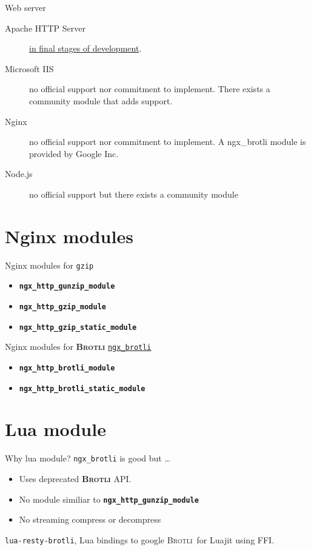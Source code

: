 \documentclass[11pt]{beamer}
\def\brotli{\textsc{Brotli}}
\newcommand{\gamename}{\textbf{\brotli}\xspace}
\begin{document}
\begin{frame}{Web server}
  \begin{description}
  \item [Apache HTTP Server] \href{https://httpd.apache.org/docs/trunk/mod/mod_brotli.html}
    {in final stages of development}.
  \item [Microsoft IIS] no official support nor commitment to implement.
    There exists a community module that adds support.
  \item [Nginx] no official support nor commitment to implement.
    A ngx\_brotli module is provided by Google Inc.
  \item [Node.js] no official support but there exists a community module
  \end{description}
\end{frame}


\section{Nginx modules}

\begin{frame}{Nginx modules for \texttt{gzip}}
  \begin{itemize}
  \item \texttt{\textbf{ngx\_http\_\alert{gunzip}\_module}}
  \item \texttt{\textbf{ngx\_http\_\alert{gzip}\_module}}
  \item \texttt{\textbf{ngx\_http\_\alert{gzip\_static}\_module}}
  \end{itemize}
\end{frame}

\begin{frame}{Nginx modules for \gamename}
  \href{https://github.com/google/ngx_brotli}{\texttt{ngx\_brotli}}
  \begin{itemize}
  \item \texttt{\textbf{ngx\_http\_\alert{brotli}\_module}}
  \item \texttt{\textbf{ngx\_http\_\alert{brotli\_static}\_module}}
  \end{itemize}
\end{frame}

\section{Lua module}

\begin{frame}{Why lua module?}
  \texttt{ngx\_brotli} is good but \ldots
  \begin{itemize}
  \item Uses deprecated \gamename API.
  \item No module similiar to \texttt{\textbf{ngx\_http\_gunzip\_module}}
  \item No streaming compress or decompress
  \end{itemize}
  
  \bigskip

  \alert{\texttt{lua-resty-brotli}}, Lua bindings to google \brotli\ for Luajit using FFI.
\end{frame}
\end{document}
